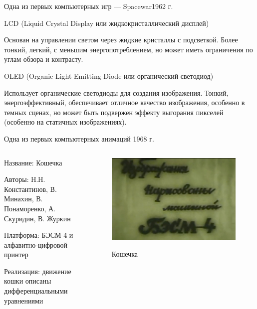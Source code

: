 \documentclass{beamer}
\begin{document}
\begin{frame}{Одна из первых компьютерных игр --- Spacewar}{1962 г.}
{		LCD (Liquid Crystal Display или жидкокристаллический дисплей)
		
		Основан на управлении светом через жидкие кристаллы с подсветкой. Более тонкий, легкий, с меньшим энергопотреблением, но может иметь ограничения по углам обзора и контрасту.
		
		OLED (Organic Light-Emitting Diode или органический светодиод)
		
		Использует органические светодиоды для создания изображения. Тонкий, энергоэффективный, обеспечивает отличное качество изображения, особенно в темных сценах, но может быть подвержен эффекту выгорания пикселей (особенно на статичных изображениях).
	}
	
	\end{frame}

\begin{frame}{Одна из первых компьютерных анимаций}
	{1968 г.}
	
	\begin{columns}
		\begin{column}{0.5\textwidth}
			
			Название: Кошечка
			
			Авторы: Н.Н. Константинов, В. Минахин, В. Понаморенко, А. Скуридин, В. Журкин
			
			Платформа: БЭСМ-4 и алфавитно-цифровой принтер
			
			Реализация: движение кошки описаны дифференциальными уравнениями
			
		\end{column}
		\begin{column}{0.5\textwidth}
			\begin{figure}
				\href{https://www.youtube.com/watch?v=LzMk5sC6eAU}{
				\includegraphics[width=\textwidth]{images/AnimatedCat.jpg}
				}
				\caption {Кошечка}
			\end{figure}
		\end{column}
	\end{columns}
\end{frame}
\end{document}
